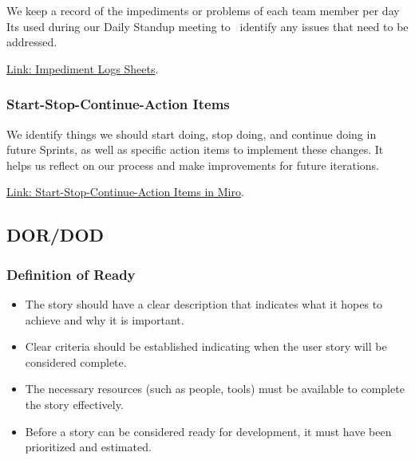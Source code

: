 We keep a record of the impediments or problems of each team member per
day It\textquotesingle s used during our Daily Standup meeting to
~identify any issues that need to be addressed.

\href{https://jalafoundation.sharepoint.com/:f:/s/CoffeeTime/EvrueabkwZZPn-vQxfzknlcBg55BRdrfIEqUw9mxtrYNWg?e=JVZHfq}{Link: Impediment Logs Sheets}.


\hypertarget{startstopcontinueactionitems}{
\subsubsection{\texorpdfstring{\textbf{Start-Stop-Continue-Action
Items}}{Start-Stop-Continue-Action Items}}\label{startstopcontinueactionitems}}

We identify things we should start doing, stop doing, and continue doing
in future Sprints, as well as specific action items to implement these
changes. It helps us reflect on our process and make improvements for
future iterations.

\href{https://miro.com/app/board/uXjVKDO7l8M=/?share_link_id=7422815223}{Link: Start-Stop-Continue-Action Items in Miro}.

\newpage

\hypertarget{dordod}{
\subsection{DOR/DOD}\label{dordod}}

\hypertarget{definitionofready}{
\subsubsection{\texorpdfstring{\textbf{Definition of
Ready}}{Definition of Ready}}\label{definitionofready}}

\begin{itemize}
\tightlist
\item
  The story should have a clear description that indicates what it hopes
  to achieve and why it is important.
\item
  Clear criteria should be established indicating when the user story
  will be considered complete.
\item
  The necessary resources (such as people, tools) must be available to
  complete the story effectively.
\item
  Before a story can be considered ready for development, it must have
  been prioritized and estimated.
\end{itemize}

